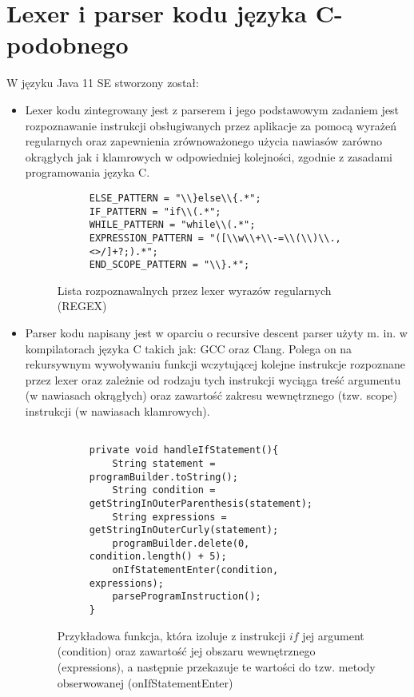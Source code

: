 \section{Lexer i parser kodu języka C-podobnego}
	W języku Java 11 SE stworzony został:
	\begin{itemize}
		\item Lexer kodu zintegrowany jest z parserem i jego podstawowym zadaniem jest rozpoznawanie instrukcji obsługiwanych przez aplikacje za pomocą wyrażeń regularnych oraz zapewnienia zrównoważonego użycia nawiasów zarówno okrągłych jak i klamrowych w odpowiedniej kolejności, zgodnie z zasadami programowania języka C. 
		\break
		
				
\begin{figure}[H]
  \begin{subfigure}{\textwidth}
			\begin{verbatim}
ELSE_PATTERN = "\\}else\\{.*";
IF_PATTERN = "if\\(.*";
WHILE_PATTERN = "while\\(.*";
EXPRESSION_PATTERN = "([\\w\\+\\-=\\(\\)\\.,<>/]+?;).*";
END_SCOPE_PATTERN = "\\}.*";
			\end{verbatim}
  \end{subfigure}\hfill
  \caption{Lista rozpoznawalnych przez lexer wyrazów regularnych (REGEX)}
\end{figure}
			
		\item Parser kodu napisany jest w oparciu o recursive descent parser użyty m. in. w kompilatorach języka C takich jak: GCC oraz Clang. Polega on na rekursywnym wywoływaniu funkcji wczytującej kolejne instrukcje rozpoznane przez lexer oraz zależnie od rodzaju tych instrukcji wyciąga treść argumentu (w nawiasach okrągłych) oraz zawartość zakresu wewnętrznego (tzw. scope) instrukcji (w nawiasach klamrowych).		
						
\begin{figure}[H]
  \begin{subfigure}{\textwidth}
			\begin{verbatim}

private void handleIfStatement(){
    String statement = programBuilder.toString();
    String condition = getStringInOuterParenthesis(statement);
    String expressions = getStringInOuterCurly(statement);
    programBuilder.delete(0, condition.length() + 5);
    onIfStatementEnter(condition, expressions);
    parseProgramInstruction();
}
			\end{verbatim}
  \end{subfigure}\hfill
  \caption{Przykładowa funkcja, która izoluje z instrukcji $if$ jej argument (condition) oraz zawartość jej obszaru wewnętrznego (expressions), a następnie przekazuje te wartości do tzw. metody obserwowanej (onIfStatementEnter)}
\end{figure}
		

\end{itemize}
